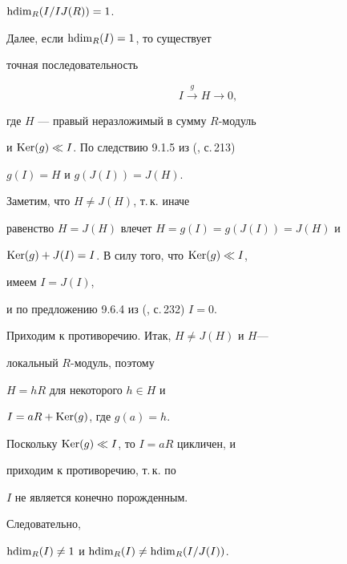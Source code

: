 $\operatorname{hdim}_{R} (I/IJ(R))=1$.





Далее, если $\operatorname{hdim}_{R} (I)=1$, то существует 


точная последовательность 


$$


I \overset{g}{\longrightarrow}{} H\longrightarrow 0,


$$


где $H$ --- правый неразложимый в сумму $R$-модуль 


и $\operatorname{Ker}(g) \ll I$. По следствию 9.1.5 из (\cite{kasch}, с.\,213) 


$g(I)=H$ и $g(J(I))=J(H)$.


Заметим, что $H \not = J(H)$, т.\,к. иначе 


равенство $H=J(H)$ влечет $H=g(I)=g(J(I))=J(H)$ и


$\operatorname{Ker}(g)+J(I)=I$. В силу того, что $\operatorname{Ker} (g) \ll I$, 


имеем $I=J(I)$,


и по предложению 9.6.4 из (\cite{kasch}, с.\,232) $I=0$.


Приходим к противоречию. Итак, $H \not = J(H)$ и $H$---


локальный $R$-модуль, поэтому 


$H=h R$ для некоторого $h \in H$ и 


$I=a R+ \operatorname{Ker} (g)$, где $g(a)=h$.


Поскольку $\operatorname{Ker}(g) \ll I$, то $I=aR$ цикличен, и 


приходим к противоречию, т.\,к. по 


\cite{gerasimov} $I$ не является конечно порожденным. 


Следовательно,


$\operatorname{hdim}_{R} (I) \ne1$ и $\operatorname{hdim}_{R} (I) \ne \operatorname{hdim}_{R} (I/J(I))$. 


 





